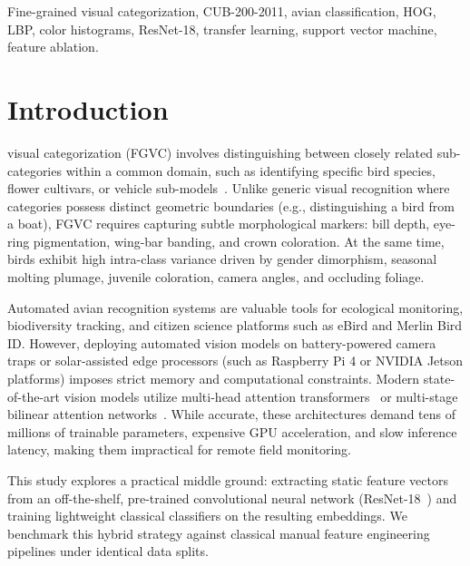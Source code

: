 \documentclass[conference]{IEEEtran}
\begin{document}
\begin{IEEEkeywords}
Fine-grained visual categorization, CUB-200-2011, avian classification, HOG, LBP, color histograms, ResNet-18, transfer learning, support vector machine, feature ablation.
\end{IEEEkeywords}

\section{Introduction}
 visual categorization (FGVC) involves distinguishing between closely related sub-categories within a common domain, such as identifying specific bird species, flower cultivars, or vehicle sub-models~\cite{wah2011cub,krause2013cars,maji2013aircraft}. Unlike generic visual recognition where categories possess distinct geometric boundaries (e.g., distinguishing a bird from a boat), FGVC requires capturing subtle morphological markers: bill depth, eye-ring pigmentation, wing-bar banding, and crown coloration. At the same time, birds exhibit high intra-class variance driven by gender dimorphism, seasonal molting plumage, juvenile coloration, camera angles, and occluding foliage.

Automated avian recognition systems are valuable tools for ecological monitoring, biodiversity tracking, and citizen science platforms such as eBird and Merlin Bird ID. However, deploying automated vision models on battery-powered camera traps or solar-assisted edge processors (such as Raspberry Pi 4 or NVIDIA Jetson platforms) imposes strict memory and computational constraints. Modern state-of-the-art vision models utilize multi-head attention transformers~\cite{he2021transfg} or multi-stage bilinear attention networks~\cite{lin2015bilinear,zhang2019part}. While accurate, these architectures demand tens of millions of trainable parameters, expensive GPU acceleration, and slow inference latency, making them impractical for remote field monitoring.

This study explores a practical middle ground: extracting static feature vectors from an off-the-shelf, pre-trained convolutional neural network (ResNet-18~\cite{he2016resnet}) and training lightweight classical classifiers on the resulting embeddings. We benchmark this hybrid strategy against classical manual feature engineering pipelines under identical data splits.
\end{document}
